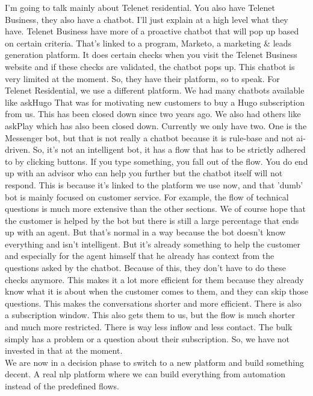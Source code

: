 \begin{appendices}
	I'm going to talk mainly about Telenet residential. You also have Telenet Business, they also have a chatbot. I'll just explain at a high level what they have. Telenet Business have more of a proactive chatbot that will pop up based on certain criteria. That's linked to a program, Marketo, a marketing \& leads generation platform. It does certain checks when you visit the Telenet Business website and if these checks are validated, the chatbot pops up. This chatbot is very limited at the moment. So, they have their platform, so to speak. For Telenet Residential, we use a different platform. We had many chatbots available like askHugo That was for motivating new customers to buy a Hugo subscription from us. This has been closed down since two years ago. We also had others like askPlay which has also been closed down. Currently we only have two. One is the Messenger bot, but that is not really a chatbot because it is rule-base and not \acrshort{ai}-driven. So, it's not an intelligent bot, it has a flow that has to be strictly adhered to by clicking buttons. If you type something, you fall out of the flow. You do end up with an advisor who can help you further but the chatbot itself will not respond. This is because it's linked to the platform we use now, and that 'dumb' bot is mainly focused on customer service. For example, the flow of technical questions is much more extensive than the other sections. We of course hope that the customer is helped by the bot but there is still a large percentage that ends up with an agent. But that's normal in a way because the bot doesn't know everything and isn't intelligent. But it's already something to help the customer and especially for the agent himself that he already has context from the questions asked by the chatbot. Because of this, they don't have to do these checks anymore. This makes it a lot more efficient for them because they already know what it is about when the customer comes to them, and they can skip those questions. This makes the conversations shorter and more efficient.
	There is also a subscription window. This also gets them to us, but the flow is much shorter and much more restricted. There is way less inflow and less contact. The bulk simply has a problem or a question about their subscription. So, we have not invested in that at the moment.\\
	\break
	We are now in a decision phase to switch to a new platform and build something decent. A real \acrshort{nlp} platform where we can build everything from automation instead of the predefined flows.
	

\end{appendices}
